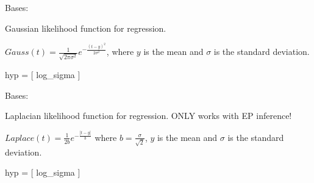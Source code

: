 \documentclass[letterpaper,10pt,english]{sphinxmanual}
\begin{document}
\begin{fulllineitems}
\label{pyGPs.Core:pyGPs.Core.lik.Gauss}
Bases: {\hyperref[Likelihoods:pyGPs.Core.lik.Likelihood]{}}

Gaussian likelihood function for regression.

$Gauss(t)=\frac{1}{\sqrt{2\pi\sigma^2}}e^{-\frac{(t-y)^2}{2\sigma^2}}$,
where $y$ is the mean and $\sigma$ is the standard deviation.

hyp = {[} log\_sigma {]}

\begin{fulllineitems}
\label{pyGPs.Core:pyGPs.Core.lik.Gauss.proceed}
\end{fulllineitems}


\end{fulllineitems}


\begin{fulllineitems}
\label{pyGPs.Core:pyGPs.Core.lik.Laplace}
Bases: {\hyperref[Likelihoods:pyGPs.Core.lik.Likelihood]{}}

Laplacian likelihood function for regression. ONLY works with EP inference!

$Laplace(t) = \frac{1}{2b}e^{-\frac{|t-y|}{b}}$ where $b=\frac{\sigma}{\sqrt{2}}$,
$y$ is the mean and $\sigma$ is the standard deviation.

hyp = {[} log\_sigma {]}

\begin{fulllineitems}
\label{pyGPs.Core:pyGPs.Core.lik.Laplace.proceed}
\end{fulllineitems}


\end{fulllineitems}

\end{document}
